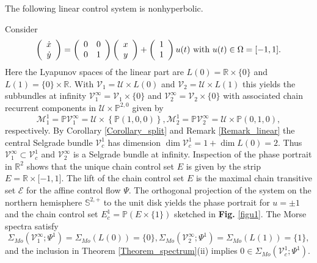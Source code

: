 	The following linear control system is nonhyperbolic.
	
	\begin{example}
		\label{Example_nonhyperbolic}Consider
		\[
		\left(
		\begin{array}
			[c]{c}%
			\dot{x}\\
			\dot{y}%
		\end{array}
		\right)  =\left(
		\begin{array}
			[c]{cc}%
			0 & 0\\
			0 & 1
		\end{array}
		\right)  \left(
		\begin{array}
			[c]{c}%
			x\\
			y
		\end{array}
		\right)  +\left(
		\begin{array}
			[c]{c}%
			1\\
			1
		\end{array}
		\right)  u(t)\mbox{ with }u(t)\in\Omega=[-1,1].
		\]
		Here the Lyapunov spaces of the linear part are $L(0)=\mathbb{R}\times\{0\}$
		and $L(1)=\{0\}\times\mathbb{R}$. With $\mathcal{V}_{1}=\mathcal{U}\times
		L(0)$ and $\mathcal{V}_{2}=\mathcal{U}\times L(1)$ this yields the subbundles
		at infinity $\mathcal{V}_{1}^{\infty}=\mathcal{V}_{1}\times\{0\}$ and
		$\mathcal{V}_{2}^{\infty}=\mathcal{V}_{2}\times\{0\}$ with associated chain
		recurrent components in $\mathcal{U}\times\mathbb{P}^{2,0}$ given by
		\[
		\mathcal{M}_{1}^{1}=\mathbb{P}\mathcal{V}_{1}^{\infty}=\mathcal{U}%
		\times\left\{  \mathbb{P}(1,0,0)\right\}  ,\mathcal{M}_{2}^{1}=\mathbb{P}%
		\mathcal{V}_{2}^{\infty}=\mathcal{U}\times\mathbb{P}(0,1,0),
		\]
		respectively. By Corollary \ref{Corollary_split} and Remark
		\ref{Remark_linear} the central Selgrade bundle $\mathcal{V}_{c}^{1}$ has
		dimension $\dim\mathcal{V}_{c}^{1}=1+\dim L(0)=2$. Thus $\mathcal{V}%
		_{1}^{\infty}\subset\mathcal{V}_{c}^{1}$ and $\mathcal{V}_{2}^{\infty}$ is a
		Selgrade bundle at infinity. Inspection of the phase portrait in
		$\mathbb{R}^{2}$ shows that the unique chain control set $E$ is given by the
		strip $E=\mathbb{R}\times\lbrack-1,1]$. The lift of the chain control set $E$
		is the maximal chain transitive set $\mathcal{E}$ for the affine control flow
		$\Psi$. The orthogonal projection of the system on the northern hemisphere
		$\mathbb{S}^{2,+}$ to the unit disk yields the phase portrait for $u=\pm1$ and
		the chain control set $E_{c}^{1}=\mathbb{P}(E\times\{1\})$ sketched in
		\textbf{Fig.} \ref{figu1}. The Morse spectra satisfy%
		\[
		\Sigma_{Mo}(\mathcal{V}_{1}^{\infty};\Psi^{1})=\Sigma_{Mo}(L(0))=\{0\},\Sigma
		_{Mo}(\mathcal{V}_{2}^{\infty};\Psi^{1})=\Sigma_{Mo}(L(1))=\{1\},
		\]
		and the inclusion in Theorem \ref{Theorem_spectrum}(ii) implies $0\in
		\Sigma_{Mo}(\mathcal{V}_{c}^{1};\Psi^{1})$.
	\end{example}
	
